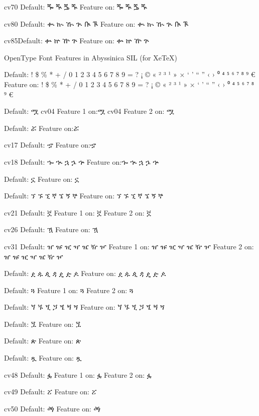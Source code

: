 \IndSS cv70 Default: ⶓ ⶔ ⶕ ⶖ
\IndSS\seventy Feature on: ⶓ ⶔ ⶕ ⶖ

\IndSS cv80 Default: ቊ ኲ ዂ ጒ ᎅ ᎍ
\IndSS\eighty Feature on: ቊ ኲ ዂ ጒ ᎅ ᎍ

\IndSS cv85Default: ቍ ኵ ዅ ጕ 
\IndSS\eightyfive Feature on: ቍ ኵ ዅ ጕ


\A OpenType Font Features in Abyssinica SIL (for XeTeX)


\IndSS Default: ! \$ \% * + / 0 1 2 3 4 5 6 7 8 9 = ? ¡ © « ² ³ ¹ » × ‘ ’ “ ” ‹ › ⁰ ⁴ ⁵ ⁶ ⁷ ⁸ ⁹ €
\IndSS\OTone Feature on: ! \$ \% * + / 0 1 2 3 4 5 6 7 8 9 = ? ¡ © « ² ³ ¹ » × ‘ ’ “ ” ‹ › ⁰ ⁴ ⁵ ⁶ ⁷ ⁸ ⁹ €


\IndSS Default: ሟ
\IndSS\OTfourone cv04 Feature 1 on:ሟ
\IndSS\OTfourtwo cv04 Feature 2 on: ሟ

\IndSS Default: ሯ
\IndSS\OTfive Feature on:ሯ

\IndSS cv17 Default: ኇ
\IndSS\OTseventeen Feature on:ኇ

\IndSS cv18 Default: ኈ ኊ ኋ ኌ ኍ
\IndSS\OTeighteen Feature on:ኈ ኊ ኋ ኌ ኍ

\IndSS Default: ኗ
\IndSS\OTnineteen Feature on: ኗ

\IndSS Default: ኘ ኙ ኚ ኛ ኜ ኝ ኞ
\IndSS\OTtwenty Feature on: ኘ ኙ ኚ ኛ ኜ ኝ ኞ

\IndSS cv21 Default: ኟ
\IndSS\OTtwentyoneone Feature 1 on: ኟ
\IndSS\OTtwentyonetwo Feature 2 on: ኟ

\IndSS cv26 Default: ዃ
\IndSS\OTtwentysix Feature on: ዃ

\IndSS cv31 Default: ዠ ዡ ዢ ዣ ዤ ዥ ዦ
\IndSS\OTthirtyoneone Feature 1 on: ዠ ዡ ዢ ዣ ዤ ዥ ዦ
\IndSS\OTthirtyonetwo Feature 2 on: ዠ ዡ ዢ ዣ ዤ ዥ ዦ

\IndSS Default: ዸ ዹ ዺ ዻ ዼ ዽ ዾ
\IndSS\OTthirtytwo Feature on: ዸ ዹ ዺ ዻ ዼ ዽ ዾ

\IndSS Default: ጓ
\IndSS\OTfortyone Feature 1 on: ጓ
\IndSS\OTfortytwo Feature 2 on: ጓ

\IndSS Default: ጘ ጙ ጚ ጛ ጜ ጝ ጞ
\IndSS\OTfortyoneone Feature on: ጘ ጙ ጚ ጛ ጜ ጝ ጞ

\IndSS Default: ጟ
\IndSS\OTfortytwoone Feature on: ጟ

\IndSS Default: ጵ
\IndSS\OTfortyfive Feature on: ጵ

\IndSS Default: ጿ
\IndSS\OTfortysix Feature on: ጿ

\IndSS cv48 Default: ፏ
\IndSS\OTfortyeightone Feature 1 on: ፏ
\IndSS\OTfortyeighttwo Feature 2 on: ፏ

\IndSS cv49 Default: ፘ
\IndSS\OTfortynine Feature on: ፘ

\IndSS cv50 Default: ፙ
\IndSS\OTfifty Feature on: ፙ

